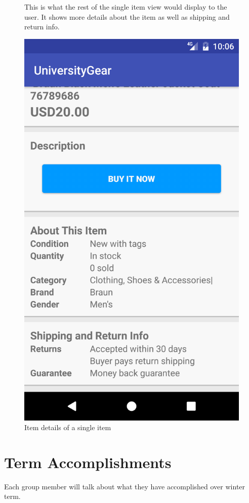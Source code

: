 \documentclass[journal,compsoc, 10pt, draftclsnofoot, onecolumn]{IEEEtran}
\begin{document}
\begin{figure}[t]
This is what the rest of the single item view would display to the user. It 
shows more details about the item as well as shipping and return info.
\centering
\caption{Item details of a single item}
\includegraphics[scale=.2]{singleview2}
\end{figure}
\FloatBarrier

\section{Term Accomplishments}
Each group member will talk about what they have accomplished over winter term.
\end{document}

